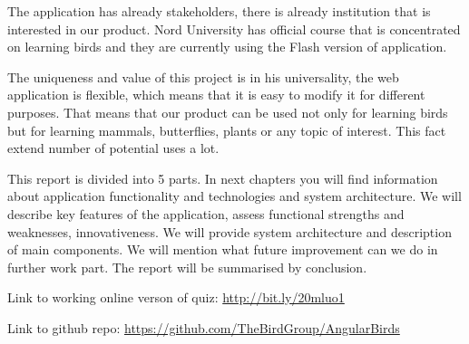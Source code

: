 \par
The application has already stakeholders, there is already institution that is interested in our product. Nord University has official course that is concentrated on learning birds and they are currently using the Flash version of application. 
\par
The uniqueness and value of this project is in his universality, the web application is flexible, which means that it is easy to modify it for different purposes. That means that our product can be used not only for learning birds but for learning mammals, butterflies, plants or any topic of interest. This fact extend number of potential uses a lot. 
\par
This report is divided into 5 parts. In next chapters you will find information about application functionality and technologies and system architecture. We will describe key features of the application, assess functional strengths and weaknesses, innovativeness. We will provide system architecture and description of main components. We will mention what future improvement can we do in further work part. The report will be summarised by conclusion.
\break
\par
Link to working online verson of quiz: \url{http://bit.ly/20mluo1}
\par
Link to github repo: \url{https://github.com/TheBirdGroup/AngularBirds}




   